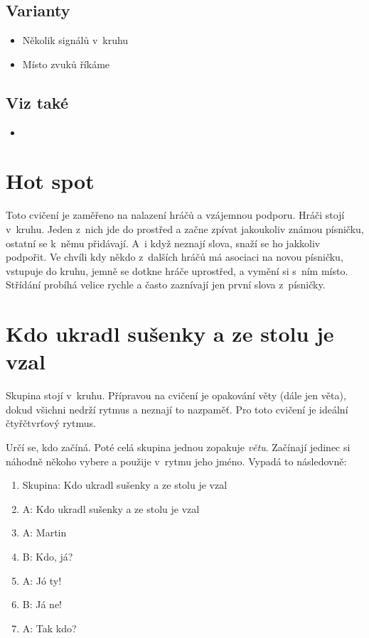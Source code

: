 \subsection{Varianty} \begin{itemize}
\item Několik signálů v~kruhu
\item Místo zvuků říkáme 
\end{itemize}
 
\subsection{Viz také} \begin{itemize}
\item  {}
\end{itemize}
 
 
 
\needspace{5cm} \section{Hot spot} \label{hot spot} Toto cvičení je zaměřeno na nalazení hráčů a vzájemnou podporu. Hráči stojí v~kruhu. Jeden z~nich jde do prostřed a začne zpívat jakoukoliv známou písničku, ostatní se k~němu přidávají. A~i když neznají slova, snaží se ho jakkoliv podpořit. Ve chvíli kdy někdo z~dalších hráčů má asociaci na novou písničku, vstupuje do kruhu, jemně se dotkne hráče uprostřed, a vymění si s~ním místo. Střídání probíhá velice rychle a často zaznívají jen první slova z~písničky. 
 
 
 
\needspace{5cm} \section{Kdo ukradl sušenky a ze stolu je vzal} \label{kdo ukradl sušenky a ze stolu je vzal} Skupina stojí v~kruhu. Přípravou na cvičení je opakování věty   (dále jen věta), dokud všichni nedrží rytmus a neznají to nazpaměť. Pro toto cvičení je ideální čtyřčtvrťový rytmus. 
 
Určí se, kdo začíná. Poté celá skupina jednou zopakuje \textit{větu}. Začínají jedinec si náhodně někoho vybere a použije v~rytmu jeho jméno. Vypadá to následovně: 
 
\begin{enumerate}
\item  Skupina: Kdo ukradl sušenky a ze stolu je vzal
\item  A: Kdo ukradl sušenky a ze stolu je vzal
\item  A: Martin
\item  B: Kdo, já?
\item  A: Jó ty!
\item  B: Já ne!
\item  A: Tak kdo?
\end{enumerate}
 
